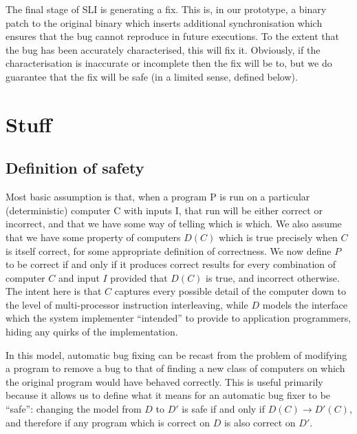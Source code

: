 \documentclass[10pt,a4paper]{report}
\begin{document}
The final stage of SLI is generating a fix.  This is, in our
prototype, a binary patch to the original binary which inserts
additional synchronisation which ensures that the bug cannot reproduce
in future executions.  To the extent that the bug has been accurately
characterised, this will fix it.  Obviously, if the characterisation
is inaccurate or incomplete then the fix will be to, but we do
guarantee that the fix will be safe (in a limited sense, defined
below).

\section{Stuff}

\subsection{Definition of safety}

Most basic assumption is that, when a program P is run on a particular
(deterministic) computer C with inputs I, that run will be either
correct or incorrect, and that we have some way of telling which is
which.  We also assume that we have some property of computers $D(C)$
which is true precisely when $C$ is itself correct, for some
appropriate definition of correctness.  We now define $P$ to be
correct if and only if it produces correct results for every
combination of computer $C$ and input $I$ provided that $D(C)$ is
true, and incorrect otherwise.  The intent here is that $C$ captures
every possible detail of the computer down to the level of
multi-processor instruction interleaving, while $D$ models the
interface which the system implementer ``intended'' to provide to
application programmers, hiding any quirks of the implementation.

In this model, automatic bug fixing can be recast from the problem of
modifying a program to remove a bug to that of finding a new class of
computers on which the original program would have behaved correctly.
This is useful primarily because it allows us to define what it means
for an automatic bug fixer to be ``safe'': changing the model from $D$
to $D'$ is safe if and only if $D(C) \rightarrow D'(C)$, and therefore
if any program which is correct on $D$ is also correct on $D'$.
\end{document}
